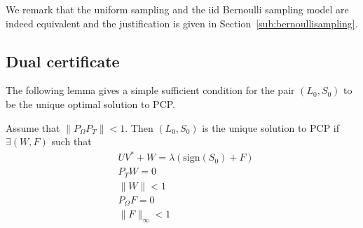 We remark that the uniform sampling and the iid Bernoulli sampling model are indeed equivalent and the justification is given in Section~\ref{sub:bernoullisampling}.
\subsection{Dual certificate}
The following lemma gives a simple sufficient condition for the pair $(L_0,S_0)$ to be the unique optimal solution to PCP.

\begin{lemma}
Assume that $\|P_\Omega P_T \| < 1$. Then $(L_0,S_0)$ is the unique solution to PCP if $\exists (W, F)$ such that
\begin{equation}
\begin{aligned}
& UV^* + W = \lambda(\text{sign}(S_0) + F) \\
& P_T W = 0 \\
& \|W\|<1 \\
& P_\Omega F = 0 \\
& \|F\|_\infty < 1
\end{aligned}
\end{equation}

\end{lemma}


